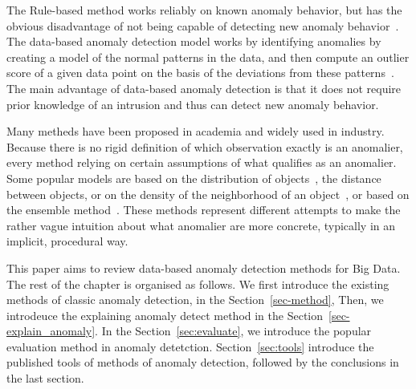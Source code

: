 The Rule-based method works 
reliably on known anomaly behavior,
but has the obvious disadvantage of 
not being capable of
detecting new anomaly behavior~\cite{chandola2009anomaly}.
The data-based anomaly detection model works by
identifying anomalies by creating a model of
the normal patterns in the data,
and then compute an outlier score of 
a given data point on the basis of 
the deviations from these patterns~\cite{chandola2009anomaly}.
The main advantage of data-based anomaly detection is that
it does not require prior knowledge of 
an intrusion and thus can detect new anomaly behavior.

Many metheds have been proposed in academia and
widely used in industry.
Because there is no rigid definition of which
observation exactly is an anomalier,
every method relying on certain assumptions of
what qualifies as an anomalier.
Some popular models are based on
the distribution of
objects~\cite{siripanadorn2010anomaly,chandola2009anomaly,kromanis2013support},
the distance~\cite{knorr1997unified}
between objects,
or on the density of
the neighborhood of
an object~\cite{agyemang2004algorithm,breunig2000lof,papadimitriou2003loci},
or based on the ensemble method~\cite{zhou2012ensemble}.
These methods represent different attempts to make
the rather vague intuition about
what anomalier are more concrete,
typically in an implicit,
procedural way.

This paper aims to review data-based 
anomaly detection methods for Big Data.
The rest of the chapter is organised as follows.
We first introduce the existing methods of classic anomaly detection,
in the Section~\ref{sec-method},
Then,
we introdeuce the explaining anomaly detect method
in the Section~\ref{sec-explain_anomaly}.
In the Section~\ref{sec:evaluate},
we introduce the popular evaluation method in anomaly detetction.
Section~\ref{sec:tools} introduce the published tools of
methods of anomaly detection,
followed by the conclusions in the last section.

